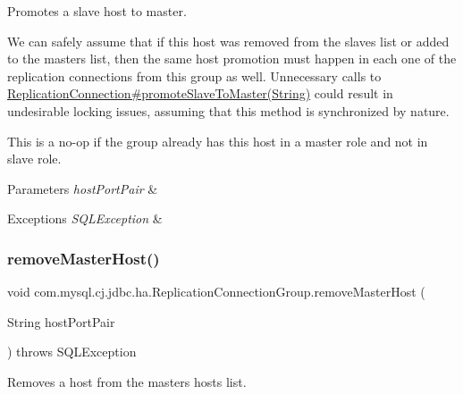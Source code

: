 Promotes a slave host to master.

We can safely assume that if this host was removed from the slaves list or added to the masters list, then the same host promotion must happen in each one of the replication connections from this group as well. Unnecessary calls to \mbox{\hyperlink{}{Replication\+Connection\#promote\+Slave\+To\+Master(\+String)}} could result in undesirable locking issues, assuming that this method is synchronized by nature.

This is a no-\/op if the group already has this host in a master role and not in slave role.


\begin{DoxyParams}{Parameters}
{\em host\+Port\+Pair} & \\
\hline
\end{DoxyParams}

\begin{DoxyExceptions}{Exceptions}
{\em S\+Q\+L\+Exception} & \\
\hline
\end{DoxyExceptions}
\mbox{\label{classcom_1_1mysql_1_1cj_1_1jdbc_1_1ha_1_1_replication_connection_group_a89849560352e7621bd8133af1af0dd3e}} 
\subsubsection{\texorpdfstring{remove\+Master\+Host()}{removeMasterHost()}\hspace{0.1cm}{\footnotesize\ttfamily [1/2]}}
{\footnotesize\ttfamily void com.\+mysql.\+cj.\+jdbc.\+ha.\+Replication\+Connection\+Group.\+remove\+Master\+Host (\begin{DoxyParamCaption}\item[{String}]{host\+Port\+Pair }\end{DoxyParamCaption}) throws S\+Q\+L\+Exception}

Removes a host from the masters hosts list.


